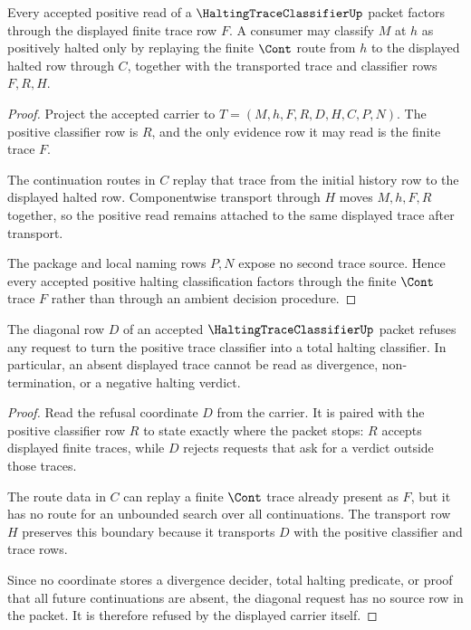 \begin{theorem}
\label{thm:halting-trace-classifier-positive-trace-soundness}
Every accepted positive read of a $\HaltingTraceClassifierUp$ packet factors through the displayed finite trace row $F$. A consumer may classify $M$ at $h$ as positively halted only by replaying the finite $\Cont$ route from $h$ to the displayed halted row through $C$, together with the transported trace and classifier rows $F,R,H$.
\end{theorem}
\begin{proof}
Project the accepted carrier to $T=(M,h,F,R,D,H,C,P,N)$. The positive classifier row is $R$, and the only evidence row it may read is the finite trace $F$.

The continuation routes in $C$ replay that trace from the initial history row to the displayed halted row. Componentwise transport through $H$ moves $M,h,F,R$ together, so the positive read remains attached to the same displayed trace after transport.

The package and local naming rows $P,N$ expose no second trace source. Hence every accepted positive halting classification factors through the finite $\Cont$ trace $F$ rather than through an ambient decision procedure.
\end{proof}

\begin{theorem}
\label{thm:halting-trace-classifier-diagonal-refusal}
The diagonal row $D$ of an accepted $\HaltingTraceClassifierUp$ packet refuses any request to turn the positive trace classifier into a total halting classifier. In particular, an absent displayed trace cannot be read as divergence, non-termination, or a negative halting verdict.
\end{theorem}
\begin{proof}
Read the refusal coordinate $D$ from the carrier. It is paired with the positive classifier row $R$ to state exactly where the packet stops: $R$ accepts displayed finite traces, while $D$ rejects requests that ask for a verdict outside those traces.

The route data in $C$ can replay a finite $\Cont$ trace already present as $F$, but it has no route for an unbounded search over all continuations. The transport row $H$ preserves this boundary because it transports $D$ with the positive classifier and trace rows.

Since no coordinate stores a divergence decider, total halting predicate, or proof that all future continuations are absent, the diagonal request has no source row in the packet. It is therefore refused by the displayed carrier itself.
\end{proof}

